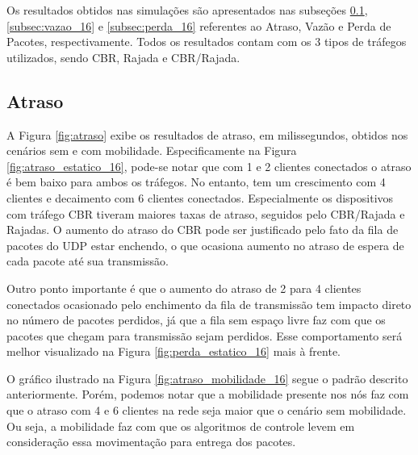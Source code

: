 \documentclass[12pt]{article}
\begin{document}
Os resultados obtidos nas simulações são apresentados nas subseções \ref{subsec:atraso_16}, \ref{subsec:vazao_16} e \ref{subsec:perda_16} referentes ao Atraso, Vazão e Perda de Pacotes, respectivamente. Todos os resultados contam com os 3 tipos de tráfegos utilizados, sendo CBR, Rajada e CBR/Rajada.

\subsection{Atraso}
\label{subsec:atraso_16}

A Figura \ref{fig:atraso} exibe os resultados de atraso, em milissegundos, obtidos nos cenários sem e com mobilidade. Especificamente na Figura \ref{fig:atraso_estatico_16}, pode-se notar que com 1 e 2 clientes conectados o atraso é bem baixo para ambos os tráfegos. No entanto, tem um crescimento com 4 clientes e decaimento com 6 clientes conectados. Especialmente os dispositivos com tráfego CBR tiveram maiores taxas de atraso, seguidos pelo CBR/Rajada e Rajadas. O aumento do atraso do CBR pode ser justificado pelo fato da fila de pacotes do UDP estar enchendo, o que ocasiona aumento no atraso de espera de cada pacote até sua transmissão.

Outro ponto importante é que o aumento do atraso de 2 para 4 clientes conectados ocasionado pelo enchimento da fila de transmissão tem impacto direto no número de pacotes perdidos, já que a fila sem espaço livre faz com que os pacotes que chegam para transmissão sejam perdidos. Esse comportamento será melhor visualizado na Figura \ref{fig:perda_estatico_16} mais à frente.

O gráfico ilustrado na Figura \ref{fig:atraso_mobilidade_16} segue o padrão descrito anteriormente. Porém, podemos notar que a mobilidade presente nos nós faz com que o atraso com 4 e 6 clientes na rede seja maior que o cenário sem mobilidade. Ou seja, a mobilidade faz com que os algoritmos de controle levem em consideração essa movimentação para entrega dos pacotes.
\end{document}
